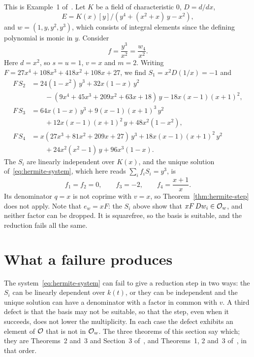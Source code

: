 \begin{example}\label{ex:fail}
This is Example~1 of~\cite[\S2.1]{bronstein1998tutorial}. Let $K$ be a field
of characteristic $0$, $D = d/dx$,
\[
  E = K(x)[y] / (y^4 + (x^2 + x)\, y - x^2),
\]
and $w = (1, y, y^2, y^3)$, which consists of integral elements since the
defining polynomial is monic in $y$. Consider
\[
  f = \frac{y^3}{x^2} = \frac{w_4}{x^2} .
\]
Here $d = x^2$, so $s = u = 1$, $v = x$ and $m = 2$. Writing $F = 27 x^4 + 108
x^3 + 418 x^2 + 108 x + 27$, we find $S_1 = x^2 D(1/x) = -1$ and
\begin{align*}
  F\,S_2 &= 24 (1 - x^2)\, y^3 + 32 x (1 - x)\, y^2 \\
         &\qquad - (9 x^4 + 45 x^3 + 209 x^2 + 63 x + 18)\, y
           - 18 x (x - 1)(x + 1)^2 , \\
  F\,S_3 &= 64 x (1 - x)\, y^3 + 9 (x - 1)(x + 1)^3\, y^2 \\
         &\qquad + 12 x (x - 1)(x + 1)^2\, y + 48 x^2 (1 - x^2) , \\
  F\,S_4 &= x (27 x^3 + 81 x^2 + 209 x + 27)\, y^3 + 18 x (x - 1)(x + 1)^2\, y^2 \\
         &\qquad + 24 x^2 (x^2 - 1)\, y + 96 x^3 (1 - x) .
\end{align*}
The $S_i$ are linearly independent over $K(x)$, and the unique solution
of~\eqref{eq:hermite-system}, which here reads $\sum_i f_i S_i = y^3$, is
\[
  f_1 = f_2 = 0, \qquad f_3 = -2, \qquad f_4 = \frac{x + 1}{x} .
\]
Its denominator $q = x$ is not coprime with $v = x$, so
Theorem~\ref{thm:hermite-step} does not apply. Note that $e_w = x F$: the
$S_i$ above show that $x F\, Dw_i \in \mathcal{O}_w$, and neither factor can be
dropped. It is squarefree, so the basis is suitable, and the reduction fails
all the same.
\end{example}

\section{What a failure produces}\label{sec:hermite-failure}

The system~\eqref{eq:hermite-system} can fail to give a reduction step in two
ways: the $S_i$ can be linearly dependent over $k(t)$, or they can be
independent and the unique solution can have a denominator with a factor in
common with $v$. A third defect is that the basis may not be suitable, so that
the step, even when it succeeds, does not lower the multiplicity. In each
case the defect exhibits an element of $\mathcal{O}$ that is not in $\mathcal{O}_w$. The
three theorems of this section say which; they are Theorems~2 and~3 and
Section~3 of~\cite{bronstein1998lazy}, and Theorems~1, 2 and~3
of~\cite[\S2.1]{bronstein1998tutorial}, in that order.

